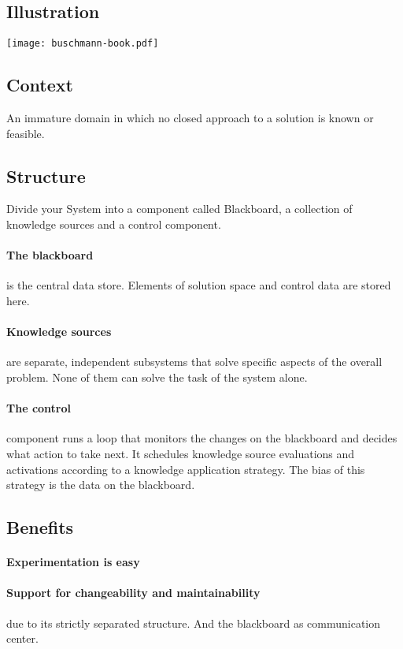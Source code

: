 \documentclass[a4paper,11pt,twocolumn]{report}
\begin{document}
    \subsection{Illustration}
    \texttt{[image: buschmann-book.pdf]}
    \subsection{Context}
    An immature domain in which no closed approach to a solution is known or
    feasible.
    \subsection{Structure}
    Divide your System into a component called Blackboard, a collection of
    knowledge sources and a control component.
    \paragraph{The blackboard} is the central data store. Elements of solution
    space and control data are stored here.
    \paragraph{Knowledge sources} are separate, independent subsystems that
    solve specific aspects of the overall problem. None of them can solve the
    task of the system alone.
    \paragraph{The control} component runs a loop that monitors the changes on
    the blackboard and decides what action to take next. It schedules knowledge
    source evaluations and activations according to a knowledge application
    strategy. The bias of this strategy is the data on the blackboard.
    \subsection{Benefits}
    \paragraph{Experimentation is easy}
    \paragraph{Support for changeability and maintainability} due to its
    strictly separated structure. And the blackboard as communication center.
\end{document}
